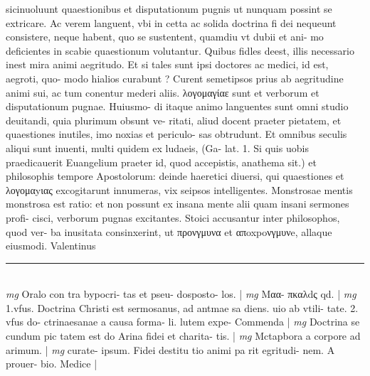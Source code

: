 \documentclass{article}
\begin{document}
\begin{pages}
sicinuoluunt quaestionibus et disputationum pugnis ut nunquam possint se extricare. Ac verem languent, vbi in cetta ac solida doctrina fi dei nequeunt consistere, neque habent, quo se sustentent, quamdiu vt dubii et ani- mo deficientes in scabie quaestionum volutantur. Quibus fidles deest, illis necessario inest mira animi aegritudo. Et si tales sunt ipsi doctores ac medici, id est, aegroti, quo- modo hialios curabunt ? Curent semetipsos prius ab aegritudine animi sui, ac tum conentur mederi aliis. λογομαγίαε sunt et verborum et disputationum pugnae. Huiusmo- di itaque animo languentes sunt omni studio deuitandi, quia plurimum obsunt ve- ritati, aliud docent praeter pietatem, et quaestiones inutiles, imo noxias et periculo- sas obtrudunt. Et omnibus seculis aliqui sunt inuenti, multi quidem ex ludaeis, (Ga- lat. 1. Si quis uobis praedicauerit Euangelium praeter id, quod accepistis, anathema sit.) et philosophis tempore Apostolorum: deinde haeretici diuersi, qui quaestiones et λογομαyιας excogitarunt innumeras, vix seipsos intelligentes. Monstrosae mentis monstrosa est ratio: et non possunt ex insana mente alii quam insani sermones profi- cisci, verborum pugnas excitantes. Stoici accusantur inter philosophos, quod ver- ba inusitata consinxerint, ut προνγμυνα et απoxpoνγμυνe, allaque eiusmodi. Valentinus  \pend\pstart  \pend
\vspace{0.5cm}\noindent
\vspace{0.2cm}\rule{1cm}{0.2pt}\\ 
\hspace{0.2cm}\textit{mg}
\footnotesize Oralo con tra bypocri- tas et pseu- dosposto- los. 
\normalsize| 
\hspace{0.2cm}\textit{mg}
\footnotesize Mαα- πκαλdς qd. 
\normalsize| 
\hspace{0.2cm}\textit{mg}
\footnotesize 1.vfus. Doctrina Christi est sermosanus, ad antmae sa diens. uio ab vtili- tate. 2. vfus do- ctrinaesanae a causa forma- li. lutem expe- Commenda 
\normalsize| 
\hspace{0.2cm}\textit{mg}
\footnotesize Doctrina se cundum pic tatem est do Arina fidei et charita- tis. 
\normalsize| 
\hspace{0.2cm}\textit{mg}
\footnotesize Mctapbora a corpore ad arimum. 
\normalsize| 
\hspace{0.2cm}\textit{mg}
\footnotesize curate- ipsum. Fidei destitu tio animi pa rit egritudi- nem. A prouer- bio. Medice    
\normalsize| 

\end{pages}
\end{document}
